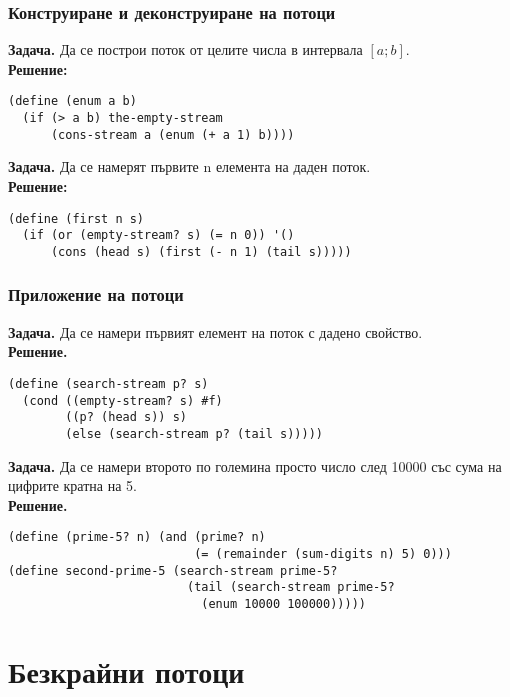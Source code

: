 \documentclass{beamer}
\begin{document}
\begin{frame}[fragile]
  \frametitle{Конструиране и деконструиране на потоци}

  \textbf{Задача.} Да се построи поток от целите числа в интервала $[a; b]$.\\
  \pause
  \textbf{Решение:}
\begin{verbatim}
(define (enum a b)
  (if (> a b) the-empty-stream
      (cons-stream a (enum (+ a 1) b))))
\end{verbatim}
  \pause
  \textbf{Задача.} Да се намерят първите n елемента на даден поток.\\
  \pause
  \textbf{Решение:}
\begin{verbatim}
(define (first n s)
  (if (or (empty-stream? s) (= n 0)) '()
      (cons (head s) (first (- n 1) (tail s)))))
\end{verbatim}
\end{frame}

\begin{frame}[fragile]
  \frametitle{Приложение на потоци}
  \textbf{Задача.} Да се намери първият елемент на поток с дадено свойство.\\
  \pause
  \textbf{Решение.}
\begin{verbatim}
(define (search-stream p? s)
  (cond ((empty-stream? s) #f)
        ((p? (head s)) s)
        (else (search-stream p? (tail s)))))
\end{verbatim}
  \pause
  \textbf{Задача.} Да се намери второто по големина просто число след 10000 със сума на цифрите кратна на 5.\\
  \pause
  \textbf{Решение.}
\begin{verbatim}
(define (prime-5? n) (and (prime? n)
                          (= (remainder (sum-digits n) 5) 0)))
(define second-prime-5 (search-stream prime-5?
                         (tail (search-stream prime-5?
                           (enum 10000 100000)))))
\end{verbatim}
\end{frame}

\section{Безкрайни потоци}
\end{document}
